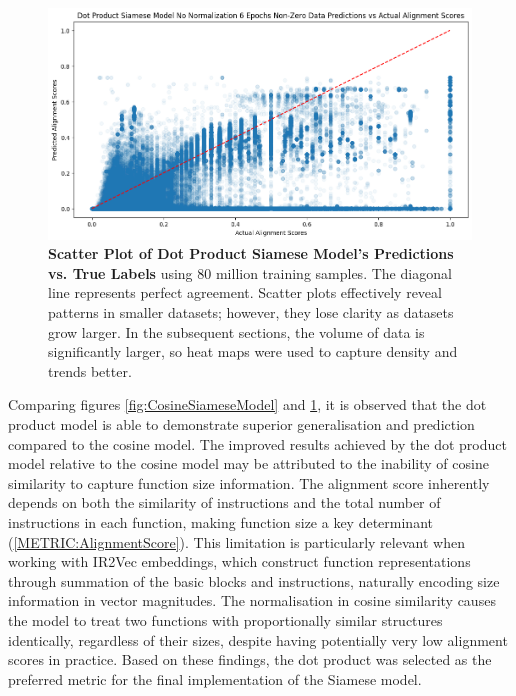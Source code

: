 \begin{figure}[tbh!]
\centering
\includegraphics[scale=0.4]{Figures/ModelArchitecture/DotProdArchitecture.png}
\caption{\textbf{Scatter Plot of Dot Product Siamese Model's Predictions vs. True Labels} using 80 million training samples. The diagonal line represents perfect agreement. Scatter plots effectively reveal patterns in smaller datasets; however, they lose clarity as datasets grow larger. In the subsequent sections, the volume of data is significantly larger, so heat maps were used to capture density and trends better.} 
\label{fig:NonNormSiameseModelNonNorm}
\end{figure}

Comparing figures \ref{fig:CosineSiameseModel} and \ref{fig:NonNormSiameseModelNonNorm}, it is observed that the dot product model is able to demonstrate superior generalisation and prediction compared to the cosine model. The improved results achieved by the dot product model relative to the cosine model may be attributed to the inability of cosine similarity to capture function size information. The alignment score inherently depends on both the similarity of instructions and the total number of instructions in each function, making function size a key determinant (\ref{METRIC:AlignmentScore}). This limitation is particularly relevant when working with IR2Vec embeddings, which construct function representations through summation of the basic blocks and instructions, naturally encoding size information in vector magnitudes. The normalisation in cosine similarity causes the model to treat two functions with proportionally similar structures identically, regardless of their sizes, despite having potentially very low alignment scores in practice. Based on these findings, the dot product was selected as the preferred metric for the final implementation of the Siamese model.


